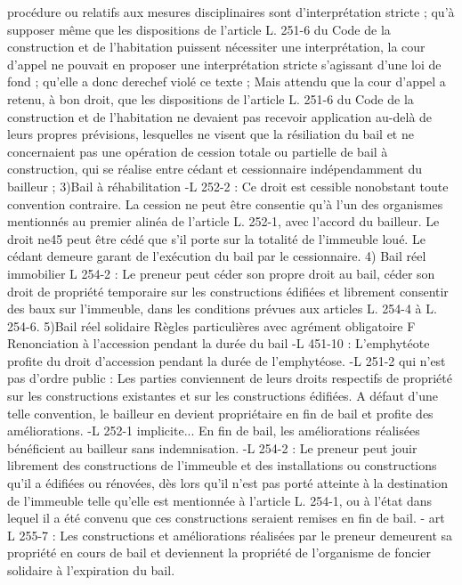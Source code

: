 \documentclass[11pt,a4paper]{report}
\begin{document}
	procédure ou relatifs aux mesures disciplinaires sont d'interprétation stricte ; qu'à supposer même que les
	dispositions de l'article L. 251-6 du Code de la construction et de l'habitation puissent nécessiter une
	interprétation, la cour d'appel ne pouvait en proposer une interprétation stricte s'agissant d'une loi de fond ;
	qu'elle a donc derechef violé ce texte ;
	Mais attendu que la cour d'appel a retenu, à bon droit, que les dispositions de l'article L. 251-6 du Code de la
	construction et de l'habitation ne devaient pas recevoir application au-delà de leurs propres prévisions,
	lesquelles ne visent que la résiliation du bail et ne concernaient pas une opération de cession totale ou partielle
	de bail à construction, qui se réalise entre cédant et cessionnaire indépendamment du bailleur ;
	3)Bail à réhabilitation
	-L 252-2 : Ce droit est cessible nonobstant toute convention contraire. La cession ne peut être consentie qu'à
	l'un des organismes mentionnés au premier alinéa de l'article L. 252-1, avec l'accord du bailleur. Le droit ne45
	peut être cédé que s'il porte sur la totalité de l'immeuble loué. Le cédant demeure garant de l'exécution du bail
	par le cessionnaire.
	4) Bail réel immobilier
	L 254-2 : Le preneur peut céder son propre droit au bail, céder son droit de propriété temporaire sur les
	constructions édifiées et librement consentir des baux sur l'immeuble, dans les conditions prévues aux articles L.
	254-4 à L. 254-6.
	5)Bail réel solidaire
	Règles particulières avec agrément obligatoire
	F Renonciation à l’accession pendant la durée du bail
	-L 451-10 : L'emphytéote profite du droit d'accession pendant la durée de l'emphytéose.
	-L 251-2 qui n’est pas d’ordre public : Les parties conviennent de leurs droits respectifs de propriété sur les
	constructions existantes et sur les constructions édifiées. A défaut d'une telle convention, le bailleur en devient
	propriétaire en fin de bail et profite des améliorations.
	-L 252-1 implicite... En fin de bail, les améliorations réalisées bénéficient au bailleur sans indemnisation.
	-L 254-2 : Le preneur peut jouir librement des constructions de l'immeuble et des installations ou constructions
	qu'il a édifiées ou rénovées, dès lors qu'il n'est pas porté atteinte à la destination de l'immeuble telle qu'elle est
	mentionnée à l'article L. 254-1, ou à l'état dans lequel il a été convenu que ces constructions seraient remises en
	fin de bail.
	- art L 255-7 : Les constructions et améliorations réalisées par le preneur demeurent sa propriété en cours de
	bail et deviennent la propriété de l'organisme de foncier solidaire à l'expiration du bail.
\end{document}
